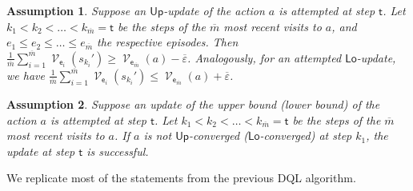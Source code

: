\documentclass{theoretics}
\DeclareMathOperator{\val}{\mathcal{V}}
\newcommand{\upperbound}{\mathsf{Up}}
\newcommand{\lowerbound}{\mathsf{Lo}}
\newcommand{\updatestep}{{\overline{\varepsilon}}}
\newcommand{\delay}{{\overline{m}}}
\newcommand{\algostep}{\mathsf{t}}
\newcommand{\algoepisode}{\mathsf{e}}
\newtheorem{assumption}{Assumption}
\begin{document}
\begin{assumption} \label{asm:dql:sampled_value_close_to_real_value}
	Suppose an $\upperbound$-update of the action $a$ is attempted at step $\algostep$.
	Let $k_1 < k_2 < \ldots < k_\delay = \algostep$ be the steps of the $\delay$ most recent visits to $a$, and $e_1 \leq e_2 \leq \ldots \leq e_\delay$ the respective episodes.
	Then $\frac{1}{\delay} \sum_{i=1}^\delay \val_{\algoepisode_i}(s_{k_i}') \geq \val_{\algoepisode_\delay}(a) - \updatestep$.
	Analogously, for an attempted $\lowerbound$-update, we have $\frac{1}{\delay} \sum_{i=1}^\delay \val_{\algoepisode_i}(s_{k_i}') \leq \val_{\algoepisode_\delay}(a) + \updatestep$.
\end{assumption}

\begin{assumption} \label{asm:dql:converged_successful_update}
	Suppose an update of the upper bound (lower bound) of the action $a$ is attempted at step $\algostep$.
	Let $k_1 < k_2 < \ldots < k_\delay = \algostep$ be the steps of the $\delay$ most recent visits to $a$.
	If $a$ is not $\upperbound$-converged ($\lowerbound$-converged) at step $k_1$, the update at step $\algostep$ is successful.
\end{assumption}
We replicate most of the statements from the previous DQL algorithm.
\end{document}
